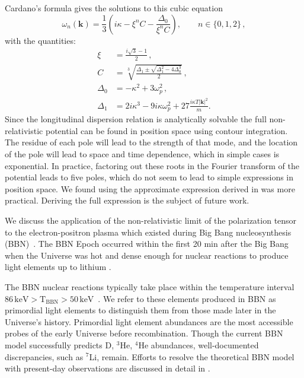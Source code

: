 Cardano's formula gives the solutions to this cubic equation
\begin{equation}\label{eq:cardano}
\omega_n(\boldsymbol{k}) = \frac{1}{3}\left(i\kappa-\xi^n C-\frac{\Delta_0}{\xi^n C}\right), \qquad n \in \{0,1,2\} \,,
\end{equation}
with the quantities:
\begin{align}\label{eq:delta}
  \xi &=\frac{i\sqrt{3}-1}{2}\,,\\
    C &= \sqrt[3]{\frac{\Delta_1 \pm \sqrt{\Delta_1^2 - 4 \Delta_0^3}}2}\,,\\
    \Delta_0 &= -\kappa^2 + 3 \omega_p^2\,,\\
\Delta_1 &= 2i\kappa^3 - 9 i\kappa \omega_p^2 + 27\frac{i\kappa T |\boldsymbol{k}|^2}{m}.
\end{align}
Since the longitudinal dispersion relation is analytically solvable the full non-relativistic potential can be found in position space using contour integration. The residue of each pole will lead to the strength of that mode, and the location of the pole will lead to space and time dependence, which in simple cases is exponential. In practice, factoring out these roots in the Fourier transform of the potential leads to five poles, which do not seem to lead to simple expressions in position space. We found using the approximate expression derived in  was more practical. Deriving the full expression is the subject of future work.


We discuss the application of the non-relativistic limit of the polarization tensor  to the electron-positron plasma which existed during Big Bang nucleosynthesis (BBN)~\cite{Grayson:2023flr}. The BBN Epoch occurred within the first 20 min after the Big Bang when the Universe was hot and dense enough for nuclear reactions to produce light elements up to lithium \cite{Pitrou:2018cgg}. 

The BBN nuclear reactions typically take place within the temperature interval $86\, \mathrm{keV}>\mathrm{T_{BBN}}>50\, \mathrm{keV}$~\cite{Pitrou:2018cgg}. We refer to these elements produced in BBN as primordial light elements to distinguish them from those made later in the Universe's history. Primordial light element abundances are the most accessible probes of the early Universe before recombination. Though the current BBN model successfully predicts D, $^3$He, $^4$He abundances, well-documented discrepancies, such as $^7$Li, remain. Efforts to resolve the theoretical BBN model with present-day observations are discussed in detail in \cite{Pitrou:2021vqr,Bertulani:2022qly}.

